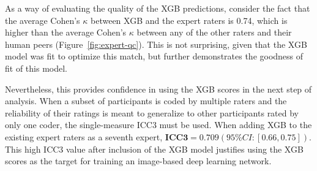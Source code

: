 \documentclass[9pt,lineno]{elife}
\begin{document}
As a way of evaluating the quality of the XGB predictions, consider the fact
that the average Cohen's $\kappa$ between XGB and the expert raters is 0.74,
which is higher than the average Cohen's $\kappa$ between any of the other raters
and their human peers (Figure~\ref{fig:expert-qc}). This is not surprising,
given that the XGB model was fit to optimize this match, but further
demonstrates the goodness of fit of this model.

Nevertheless, this provides confidence in using the XGB scores in the next step
of analysis. When a subset of participants is coded by multiple raters and the
reliability of their ratings is meant to generalize to other participants rated by
only one coder, the single-measure ICC3 must be used. When adding XGB to the
existing expert raters as a seventh expert, $\textbf{ICC3} = 0.709 (95\% CI:
[0.66, 0.75])$. This high ICC3 value after inclusion of the XGB model justifies
using the XGB scores as the target for training an image-based deep learning
network.
\end{document}

